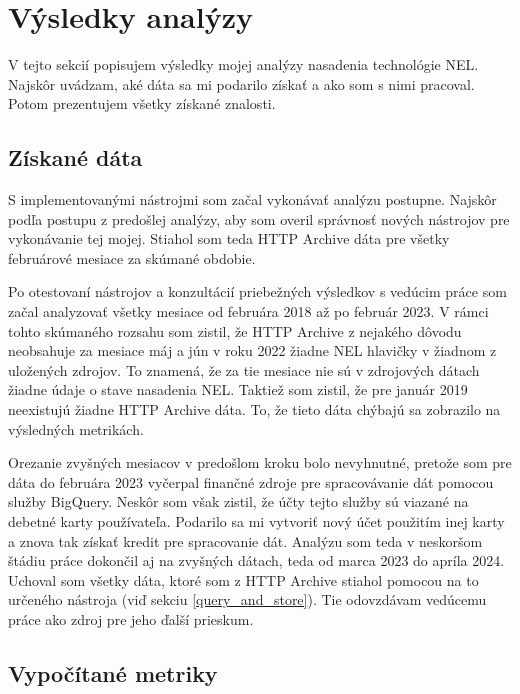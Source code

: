
\section{Výsledky analýzy}
\label{sec:results}

V tejto sekcií popisujem výsledky mojej analýzy nasadenia technológie NEL. 
Najskôr uvádzam, aké dáta sa mi podarilo získať a ako som s nimi pracoval.
Potom prezentujem všetky získané znalosti.

\subsection{Získané dáta}
\label{result-data}

S implementovanými nástrojmi som začal vykonávať analýzu postupne. Najskôr podľa postupu z predošlej analýzy, aby som overil správnosť nových nástrojov pre vykonávanie tej mojej.
Stiahol som teda HTTP Archive dáta pre všetky februárové mesiace za skúmané obdobie.

Po otestovaní nástrojov a konzultácií priebežných výsledkov s vedúcim práce som začal analyzovať všetky mesiace od februára 2018 až po február 2023.
V rámci tohto skúmaného rozsahu som zistil, že HTTP Archive z nejakého dôvodu neobsahuje za mesiace máj a jún v roku 2022 žiadne NEL hlavičky 
v žiadnom z uložených zdrojov. 
To znamená, že za tie mesiace nie sú v zdrojových dátach žiadne údaje o stave nasadenia NEL.
Taktiež som zistil, že pre január 2019 neexistujú žiadne HTTP Archive dáta.
To, že tieto dáta chýbajú sa zobrazilo na výsledných metrikách.

Orezanie zvyšných mesiacov v predošlom kroku bolo nevyhnutné, pretože som pre dáta do februára 2023 vyčerpal finančné zdroje pre spracovávanie dát pomocou služby BigQuery.
Neskôr som však zistil, že účty tejto služby sú viazané na debetné karty používateľa.
Podarilo sa mi vytvoriť nový účet použitím inej karty a znova tak získať kredit pre spracovanie dát.
Analýzu som teda v neskoršom štádiu práce dokončil aj na zvyšných dátach, teda od marca 2023 do apríla 2024.
Uchoval som všetky dáta, ktoré som z HTTP Archive stiahol pomocou na to určeného nástroja (viď sekciu \ref{query_and_store}). 
Tie odovzdávam vedúcemu práce ako zdroj pre jeho ďalší prieskum.

\subsection{Vypočítané metriky}

